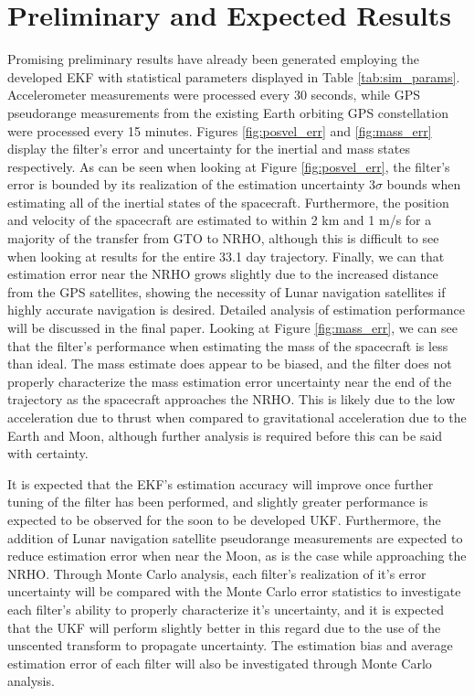 \documentclass[letterpaper, submit]{AAS}			%
\begin{document}
\section{Preliminary and Expected Results}
Promising preliminary results have already been generated employing the developed EKF with statistical parameters displayed in Table \ref{tab:sim_params}. Accelerometer measurements were processed every 30 seconds, while GPS pseudorange measurements from the existing Earth orbiting GPS constellation were processed every 15 minutes. Figures \ref{fig:posvel_err} and \ref{fig:mass_err} display the filter's error and uncertainty for the inertial and mass states respectively. As can be seen when looking at Figure \ref{fig:posvel_err}, the filter's error is bounded by its realization of the estimation uncertainty $3\sigma$ bounds when estimating all of the inertial states of the spacecraft. Furthermore, the position and velocity of the spacecraft are estimated to within 2 km and 1 m/s for a majority of the transfer from GTO to NRHO, although this is difficult to see when looking at results for the entire 33.1 day trajectory. Finally, we can that estimation error near the NRHO grows slightly due to the increased distance from the GPS satellites, showing the necessity of Lunar navigation satellites if highly accurate navigation is desired. Detailed analysis of estimation performance will be discussed in the final paper. Looking at Figure \ref{fig:mass_err}, we can see that the filter's performance when estimating the mass of the spacecraft is less than ideal. The mass estimate does appear to be biased, and the filter does not properly characterize the mass estimation error uncertainty near the end of the trajectory as the spacecraft approaches the NRHO. This is likely due to the low acceleration due to thrust when compared to gravitational acceleration due to the Earth and Moon, although further analysis is required before this can be said with certainty. 

It is expected that the EKF's estimation accuracy will improve once further tuning of the filter has been performed, and slightly greater performance is expected to be observed for the soon to be developed UKF. Furthermore, the addition of Lunar navigation satellite pseudorange measurements are expected to reduce estimation error when near the Moon, as is the case while approaching the NRHO. Through Monte Carlo analysis, each filter's realization of it's error uncertainty will be compared with the Monte Carlo error statistics to investigate each filter's ability to properly characterize it's uncertainty, and it is expected that the UKF will perform slightly better in this regard due to the use of the unscented transform to propagate uncertainty. The estimation bias and average estimation error of each filter will also be investigated through Monte Carlo analysis.
\end{document}
